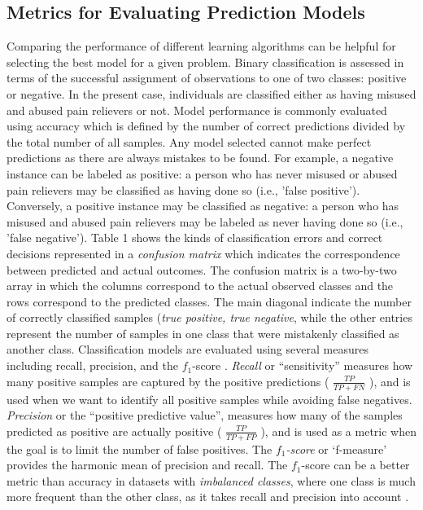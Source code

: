 \documentclass[sigconf]{acmart}
\begin{document}

\subsection{Metrics for Evaluating Prediction Models}

Comparing the performance of different learning algorithms can be helpful for 
selecting the best model for a given problem. Binary classification is assessed 
in terms of the successful assignment of observations to one of two classes: 
positive or negative. In the present case, individuals are classified either 
as having misused and abused pain relievers or not. Model performance is 
commonly evaluated using accuracy which is defined by the number of correct 
predictions divided by the total number of all samples. Any model selected 
cannot make perfect predictions as there are always mistakes to be found. 
For example, a negative instance can be labeled as positive: a person who has 
never misused or abused pain relievers may be classified as having done so 
(i.e., 'false positive'). Conversely, a positive instance may be classified 
as negative: a person who has misused and abused pain relievers may be labeled 
as never having done so (i.e., 'false negative'). Table 1 shows the kinds of 
classification errors and correct decisions represented in a 
\emph{confusion matrix} which indicates the correspondence between predicted 
and actual outcomes. The confusion matrix is a two-by-two array in which the 
columns correspond to the actual observed classes and the rows correspond to 
the predicted classes. The main diagonal indicate the number of correctly 
classified samples (\emph{true positive, true negative}, while the other 
entries represent the number of samples in one class that were mistakenly 
classified as another class. Classification models are evaluated using several 
measures including recall, precision, and the $f_1$-score \cite{wiki18}. 
\emph{Recall} or ``sensitivity'' measures how many positive samples are 
captured by the positive predictions ( \(\frac{TP}{TP+FN}\) ), and is used 
when we want to identify all positive samples while avoiding false negatives. 
\emph{Precision} or the ``positive predictive value'', measures how many of 
the samples predicted as positive are actually positive 
( \(\frac{TP}{TP+FP}\) ), and is used as a metric when the goal is to limit 
the number of false positives. The \emph{$f_1$-score} or `f-measure' provides 
the harmonic mean of precision and recall. The $f_1$-score can be a better 
metric than accuracy in datasets with \emph{imbalanced classes}, where one 
class is much more frequent than the other class, as it takes recall and 
precision into account \cite{muller17}.
\end{document}
